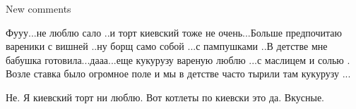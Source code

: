  
 
 
 
 

New comments

Фууу...не люблю сало ..и торт киевский тоже не очень...Больше предпочитаю
вареники с вишней ..ну борщ само собой ...с пампушками ..В детстве мне бабушка
готовила...дааа...еще кукурузу вареную люблю ...с маслицем и солью . Возле
ставка было огромное поле и мы в детстве часто тырили там кукурузу ...


Не. Я киевский торт ни люблю. Вот котлеты по киевски это да. Вкусные.
